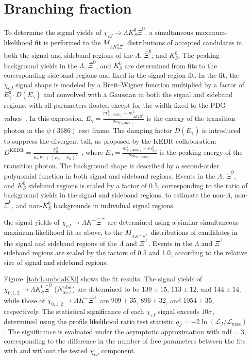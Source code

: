 \documentclass[amsmath,amssymb,twocolumn,prd,floatfix,showpacs,nofootinbib]{revtex4-1}
\begin{document}
\section{Branching fraction}


To determine the signal yields of $\chi_{cJ}\to\Lambda K^0_S\bar{\Xi}^0$, a simultaneous maximum-likelihood fit is performed to the $M_{\Lambda K^0_S\bar{\Xi}^0}$ distributions of accepted candidates in both the signal and sideband regions of the $\Lambda$, $\bar{\Xi}^0$, and $K^0_S$. The peaking background yields in the $\Lambda$, $\bar{\Xi}^0$, and $K^0_S$ are determined from fits to the corresponding sideband regions and fixed in the signal-region fit. In the fit, the $\chi_{cJ}$ signal shape is modeled by a Breit--Wigner function multiplied by a factor of $E_{\gamma}^3 \cdot D(E_{\gamma})$ and convolved with a Gaussian in both the signal and sideband regions, with all parameters floated except for the width fixed to the PDG values~\cite{ref::pdg2024}. In this expression, $E_{\gamma} = \frac{m_{\psi(3686)}^2 - m_{\Lambda K_S^0 \bar{\Xi}^0}^2}{2m_{\psi(3686)}}$ is the energy of the transition photon in the $\psi(3686)$ rest frame. The damping factor $D(E_{\gamma})$ is introduced to suppress the divergent tail, as proposed by the KEDR collaboration: $D^{\mathrm{KEDR}}=\frac{E_0^2}{E_{\gamma}E_0+(E_{\gamma}-E_0)^2}$~\cite{ref::damping}, where $E_0=\frac{m_{\psi(3686)}^2-m_{\chi_{cJ}}^2}{2m_{\psi(3686)}}$ is the peaking energy of the transition photon.
The background shape is described by a second-order polynomial function in both signal and sideband regions. Events in the $\Lambda$, $\bar{\Xi}^0$, and $K^0_S$ sideband regions is scaled by a factor of 0.5, corresponding to the ratio of background yields in the signal and sideband regions, to estimate the non-$\Lambda$, non-$\bar \Xi^0$, and non-$K^0_S$ backgrounds in individual signal regions.

the signal yields of $\chi_{cJ}\to\Lambda K^-\bar{\Xi}^+$ are determined using a similar simultaneous maximum-likelihood fit as above, to the $M_{\Lambda K^- \bar{\Xi}^+}$ distributions of candidates in the signal and sideband regions of the $\Lambda$ and $\bar{\Xi}^+$.
Events in the $\Lambda$ and $\bar{\Xi}^+$ sideband regions are scaled by the factors of 0.5 and 1.0, according to the relative size of signal and sideband regions.
		
Figure~\ref{tab:LambdaKXi} shows the fit results. The signal yields of $\chi_{0,1,2}\to\Lambda K^0_S\bar{\Xi}^0$ ($N_{\chi_{cJ}}^{\rm obs}$) are determined to be $139\pm15$, $113\pm12$, and $144\pm14$, while those of  $\chi_{0,1,2}\to\Lambda K^-\bar{\Xi}^+$ are $909\pm35$, $896\pm32$, and $1054\pm35$, respectively. 
The statistical significance of each $\chi_{cJ}$ signal exceeds $10\sigma$, determined using the profile likelihood ratio test statistic
$q_J=-2\ln(\mathcal{L}_J/\mathcal{L}_{\max})$.
The significance is evaluated under the asymptotic approximation with $\mathrm{ndf}=3$, corresponding to the difference in the number of free parameters between the fits with and without the tested $\chi_{cJ}$ component.
		
\end{document}

